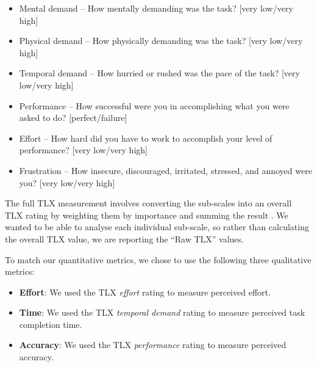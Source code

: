 {\singlespacing
\begin{itemize}
  \item Mental demand -- How mentally demanding was the task? [very low/very high]
  \item Physical demand -- How physically demanding was the task? [very low/very high]
  \item Temporal demand -- How hurried or rushed was the pace of the task?  [very low/very high]
  \item Performance -- How successful were you in accomplishing what you were asked to do? [perfect/failure]
  \item Effort -- How hard did you have to work to accomplish your level of performance? [very low/very high]
  \item Frustration -- How insecure, discouraged, irritated, stressed, and annoyed were you? [very low/very high]
\end{itemize}
}

The full TLX measurement involves converting the sub-scales into an overall TLX rating by weighting them by importance
and summing the result \citep{Hart2006}. We wanted to be able to analyse each individual sub-scale, so rather than
calculating the overall TLX value, we are reporting the ``Raw TLX'' values.

To match our quantitative metrics, we chose to use the following three qualitative metrics:

\begin{itemize}
  \item \textbf{Effort}:
    We used the TLX \textit{effort} rating to measure perceived effort.
  \item \textbf{Time}:
    We used the TLX \textit{temporal demand} rating to measure perceived task completion time.
  \item \textbf{Accuracy}:
    We used the TLX \textit{performance} rating to measure perceived accuracy.
\end{itemize}

